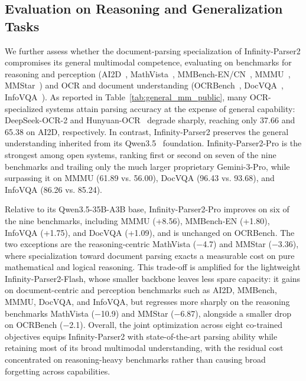 \subsection{Evaluation on Reasoning and Generalization Tasks}

We further assess whether the document-parsing specialization of Infinity-Parser2 compromises its general multimodal competence, evaluating on benchmarks for reasoning and perception (AI2D~\cite{kembhavi2016diagram}, MathVista~\cite{lu2023mathvista}, MMBench-EN/CN~\cite{liu2024mmbench}, MMMU~\cite{yue2024mmmu}, MMStar~\cite{chen2024we}) and OCR and document understanding (OCRBench~\cite{liu2024ocrbench}, DocVQA~\cite{docvqa}, InfoVQA~\cite{infovqa}). As reported in Table~\ref{tab:general_mm_public}, many OCR-specialized systems attain parsing accuracy at the expense of general capability: DeepSeek-OCR-2 and Hunyuan-OCR~\cite{tencent2025hunyuanocr} degrade sharply, reaching only 37.66 and 65.38 on AI2D, respectively. In contrast, Infinity-Parser2 preserves the general understanding inherited from its Qwen3.5~\cite{qwen3.5} foundation. Infinity-Parser2-Pro is the strongest among open systems, ranking first or second on seven of the nine benchmarks and trailing only the much larger proprietary Gemini-3-Pro, while surpassing it on MMMU (61.89 vs. 56.00), DocVQA (96.43 vs. 93.68), and InfoVQA (86.26 vs. 85.24).

Relative to its Qwen3.5-35B-A3B base, Infinity-Parser2-Pro improves on six of the nine benchmarks, including MMMU (+8.56), MMBench-EN (+1.80), InfoVQA (+1.75), and DocVQA (+1.09), and is unchanged on OCRBench. The two exceptions are the reasoning-centric MathVista ($-$4.7) and MMStar ($-$3.36), where specialization toward document parsing exacts a measurable cost on pure mathematical and logical reasoning. This trade-off is amplified for the lightweight Infinity-Parser2-Flash, whose smaller backbone leaves less spare capacity: it gains on document-centric and perception benchmarks such as AI2D, MMBench, MMMU, DocVQA, and InfoVQA, but regresses more sharply on the reasoning benchmarks MathVista ($-$10.9) and MMStar ($-$6.87), alongside a smaller drop on OCRBench ($-$2.1). Overall, the joint optimization across eight co-trained objectives equips Infinity-Parser2 with state-of-the-art parsing ability while retaining most of its broad multimodal understanding, with the residual cost concentrated on reasoning-heavy benchmarks rather than causing broad forgetting across capabilities.


